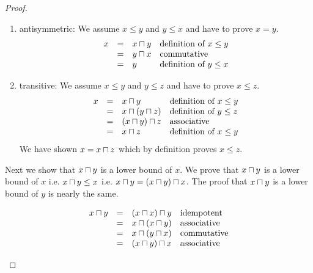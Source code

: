 \begin{definition}
\begin{proof}
\begin{enumerate}
\begin{enumerate}
                    \item antisymmetric: We assume $x \le y$ and $y \le x$ and
                        have to prove $x = y$.
                        $$
                        \begin{array}{lllll} 
                            x &=& x \sqcap y &\text{definition of $x \le y$}
                            \\
                            &=& y \sqcap x   &\text{commutative}
                            \\
                            &=& y &\text{definition of $y \le x$}
                         \end{array}
                        $$

                    \item transitive: We assume $x \le y$ and $y \le z$ and have
                        to prove $x \le z$.
                        $$
                        \begin{array}{lllll} 
                            x
                            &=& x \sqcap y
                            &\text{definition of $x \le y$}
                            \\
                            &=& x \sqcap (y \sqcap z)
                            &\text{definition of $y \le z$}
                            \\
                            &=& (x \sqcap y) \sqcap z
                            &\text{associative}
                            \\
                            &=& x \sqcap z
                            &\text{definition of $x \le y$}
                         \end{array}
                        $$
                        We have shown $x = x \sqcap z$ which by definition proves
                        $x \le z$.
                \end{enumerate}

                Next we show that $x \sqcap y$ is a lower bound of $x$. We prove
                that $x \sqcap y$ is a lower bound of $x$ i.e.
                $x \sqcap y \le x$ i.e. $x \sqcap y = (x \sqcap y) \sqcap x$. The
                proof that $x \sqcap y$ is a lower bound of $y$ is nearly the
                same.

                $$
                \begin{array}{lllll} 
                    x \sqcap y
                    &=& (x \sqcap x) \sqcap y
                    &\text{idempotent}
                    \\
                    &=& x \sqcap (x \sqcap y)
                    &\text{associative}
                    \\
                    &=& x \sqcap (y \sqcap x)
                    &\text{commutative}
                    \\
                    &=& (x \sqcap y) \sqcap x
                    &\text{associative}
                 \end{array}
                $$


\end{enumerate}
\end{proof}
\end{definition}
